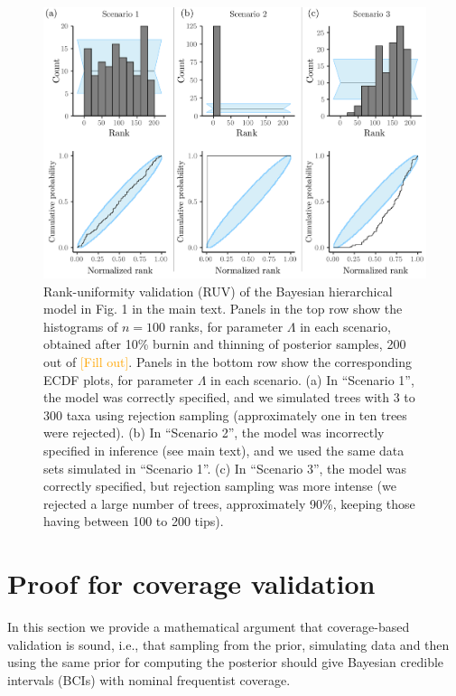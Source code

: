 \documentclass[oneside]{article}
\begin{document}
\begin{figure}[!ht]
   \includegraphics[width=\linewidth]{../figures/sbc_Yule_lambda_manual.pdf}
  \caption{Rank-uniformity validation (RUV) of the Bayesian hierarchical model in Fig. 1 in the main text.
    Panels in the top row show the histograms of $n=100$ ranks, for parameter $\Lambda$ in each scenario, obtained after 10\% burnin and thinning of posterior samples, 200 out of \textcolor{orange}{[Fill out]}.
    Panels in the bottom row show the corresponding ECDF plots, for parameter $\Lambda$ in each scenario.
    (a) In ``Scenario 1'', the model was correctly specified, and we simulated trees with 3 to 300 taxa using rejection sampling (approximately one in ten trees were rejected).
    (b) In ``Scenario 2'', the model was incorrectly specified in inference (see main text), and we used the same data sets simulated in ``Scenario 1''.
    (c) In ``Scenario 3'', the model was correctly specified, but rejection sampling was more intense (we rejected a large number of trees, approximately 90\%, keeping those having between 100 to 200 tips).
   }
  \label{fig:ruv_yule_lambda}
\end{figure}


\newpage
\section{Proof for coverage validation}
 \label{appendix::sec:proofs}

In this section we provide a mathematical argument that coverage-based validation is sound, i.e., that sampling from the prior, simulating data and then using the same prior for computing the posterior should give Bayesian credible intervals (BCIs) with nominal frequentist coverage.
\end{document}
